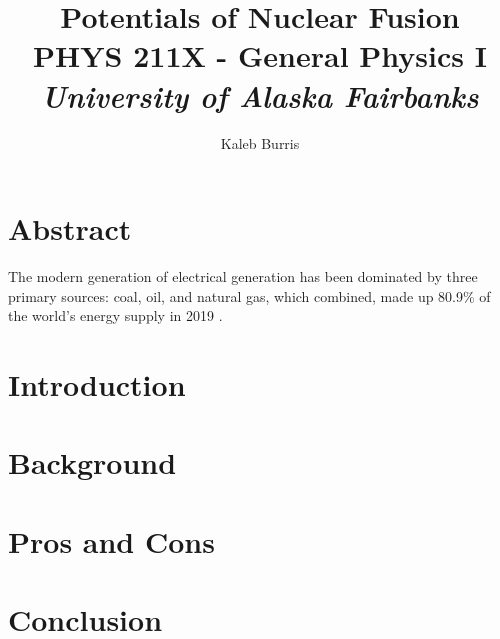 \documentclass[12pt]{article}
\title{
    \textbf{Potentials of Nuclear Fusion} 
    \\
    \vspace{0.5cm}
    \large PHYS 211X - General Physics I
    \\
    \emph{University of Alaska Fairbanks}
}
\date{}
\author{
    Kaleb Burris
}
\begin{document}
    \maketitle

    \thispagestyle{plain}

    \section{Abstract}

    The modern generation of electrical generation has been dominated by three primary sources: coal, oil, and natural gas, which combined, made up 80.9\% of the world's energy supply in 2019 \citep[Supply]{KWES}.

    \pagebreak

    \section{Introduction}

    \lipsum[3-5]

    \pagebreak

    \section{Background}

    \lipsum[6-9]

    \pagebreak

    \section{Pros and Cons}

    \lipsum[10-14]

    \pagebreak

    \section{Conclusion}

    \lipsum[15-19]

    \pagebreak

    \pagestyle{empty}

    

    
\end{document}
